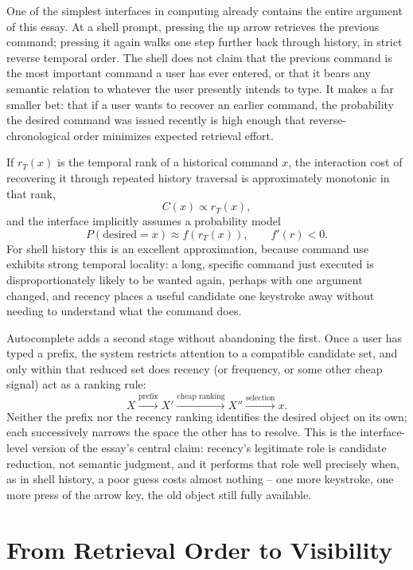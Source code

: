 \documentclass[11pt]{article}
\begin{document}
One of the simplest interfaces in computing already contains the entire argument of this essay. At a shell prompt, pressing the up arrow retrieves the previous command; pressing it again walks one step further back through history, in strict reverse temporal order. The shell does not claim that the previous command is the most important command a user has ever entered, or that it bears any semantic relation to whatever the user presently intends to type. It makes a far smaller bet: that if a user wants to recover an earlier command, the probability the desired command was issued recently is high enough that reverse-chronological order minimizes expected retrieval effort.

If $r_T(x)$ is the temporal rank of a historical command $x$, the interaction cost of recovering it through repeated history traversal is approximately monotonic in that rank,
\[
C(x) \propto r_T(x),
\]
and the interface implicitly assumes a probability model
\[
P(\text{desired}=x) \approx f(r_T(x)), \qquad f'(r) < 0.
\]
For shell history this is an excellent approximation, because command use exhibits strong temporal locality: a long, specific command just executed is disproportionately likely to be wanted again, perhaps with one argument changed, and recency places a useful candidate one keystroke away without needing to understand what the command does.

Autocomplete adds a second stage without abandoning the first. Once a user has typed a prefix, the system restricts attention to a compatible candidate set, and only within that reduced set does recency (or frequency, or some other cheap signal) act as a ranking rule:
\[
X \xrightarrow{\text{prefix}} X' \xrightarrow{\text{cheap ranking}} X'' \xrightarrow{\text{selection}} x.
\]
Neither the prefix nor the recency ranking identifies the desired object on its own; each successively narrows the space the other has to resolve. This is the interface-level version of the essay's central claim: recency's legitimate role is candidate reduction, not semantic judgment, and it performs that role well precisely when, as in shell history, a poor guess costs almost nothing -- one more keystroke, one more press of the arrow key, the old object still fully available.

\section{From Retrieval Order to Visibility}
\end{document}
